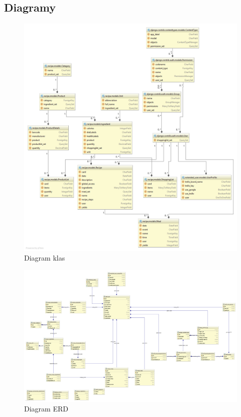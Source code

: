 \documentclass{article}
\begin{document}
\subsection{Diagramy}
\begin{figure}[!ht]
  \centering
    \includegraphics[width=1\textwidth]{class}\par\vspace{1cm}
  \caption{Diagram klas}
\end{figure}

\begin{landscape}
\begin{figure}[!ht]
  \centering
    \includegraphics[width=1.5\textwidth]{erd}\par\vspace{1cm}
  \caption{Diagram ERD}
\end{figure}
\end{landscape}
\end{document}
